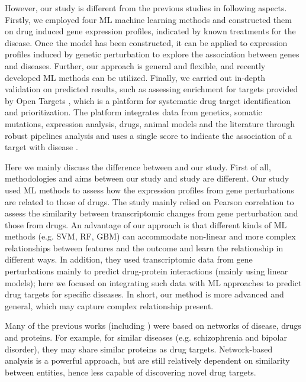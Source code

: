    However, our study is different from the previous studies in following aspects. Firstly, we employed four ML machine learning methods and constructed them on drug induced gene expression profiles, indicated by known treatments for the disease. Once the model has been constructed, it can be applied to expression profiles induced by genetic perturbation to explore the association between genes and diseases. Further, our approach is general and flexible, and recently developed ML methods can be utilized. Finally, we carried out in-depth validation on predicted results, such as assessing enrichment for targets provided by Open Targets \cite{koscielny2017open}, which is a platform for systematic drug target identification and prioritization. The platform integrates data from genetics, somatic mutations, expression analysis, drugs, animal models and the literature through robust pipelines analysis and uses a single score to indicate the association of a target with disease \cite{koscielny2017open}.

    Here we mainly discuss the difference between \cite{sawada2018predicting} and our study. First of all, methodologies and aims between our study and study \cite{sawada2018predicting} are different. Our study used ML methods to assess how the expression profiles from gene perturbations are related to those of drugs. The study mainly relied on Pearson correlation to assess the similarity between transcriptomic changes from gene perturbation and those from drugs. An advantage of our approach is that different kinds of ML methods (e.g. SVM, RF, GBM) can accommodate non-linear and more complex relationships between features and the outcome and learn the relationship in different ways. In addition, they used transcriptomic data from gene perturbations mainly to predict drug-protein interactions (mainly using linear models); here we focused on integrating such data with ML approaches to predict drug targets for specific diseases. In short, our method is more advanced and general, which may capture complex relationship present. 

    Many of the previous works (including \cite{sawada2018predicting, li2015large, emig2013drug}) were based on networks of disease, drugs and proteins. For example, for similar diseases (e.g. schizophrenia and bipolar disorder), they may share similar proteins as drug targets. Network-based analysis is a powerful approach, but are still relatively dependent on similarity between entities, hence less capable of discovering novel drug targets. 

